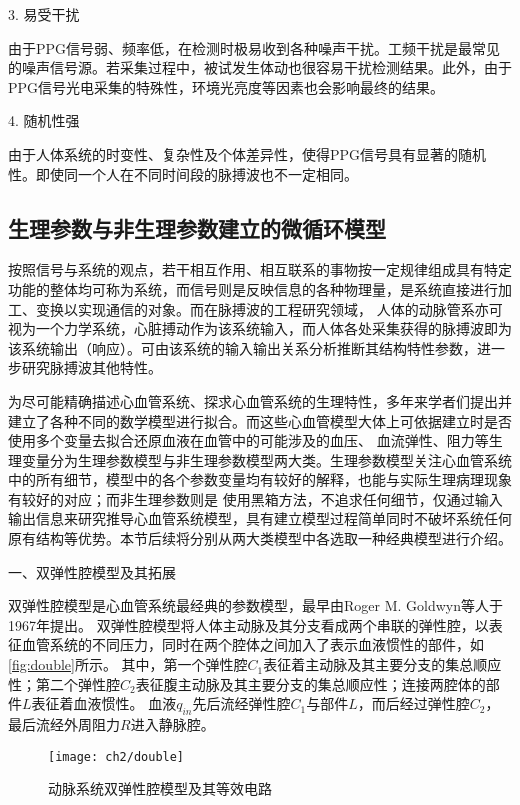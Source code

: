 3. 易受干扰

由于PPG信号弱、频率低，在检测时极易收到各种噪声干扰。工频干扰是最常见的噪声信号源。若采集过程中，被试发生体动也很容易干扰检测结果。此外，由于PPG信号光电采集的特殊性，环境光亮度等因素也会影响最终的结果。

4. 随机性强

由于人体系统的时变性、复杂性及个体差异性，使得PPG信号具有显著的随机性。即使同一个人在不同时间段的脉搏波也不一定相同。
\subsection{生理参数与非生理参数建立的微循环模型}
按照信号与系统的观点，若干相互作用、相互联系的事物按一定规律组成具有特定功能的整体均可称为系统，而信号则是反映信息的各种物理量，是系统直接进行加工、变换以实现通信的对象\cite{Alan2019}。而在脉搏波的工程研究领域，
人体的动脉管系亦可视为一个力学系统，心脏搏动作为该系统输入，而人体各处采集获得的脉搏波即为该系统输出（响应）。可由该系统的输入输出关系分析推断其结构特性参数，进一步研究脉搏波其他特性\cite{PPGYY}。

为尽可能精确描述心血管系统、探求心血管系统的生理特性，多年来学者们提出并建立了各种不同的数学模型进行拟合。而这些心血管模型大体上可依据建立时是否使用多个变量去拟合还原血液在血管中的可能涉及的血压、
血流弹性、阻力等生理变量分为生理参数模型与非生理参数模型两大类。生理参数模型关注心血管系统中的所有细节，模型中的各个参数变量均有较好的解释，也能与实际生理病理现象有较好的对应；而非生理参数则是
使用黑箱方法，不追求任何细节，仅通过输入输出信息来研究推导心血管系统模型，具有建立模型过程简单同时不破坏系统任何原有结构等优势。本节后续将分别从两大类模型中各选取一种经典模型进行介绍。

一、双弹性腔模型及其拓展

双弹性腔模型是心血管系统最经典的参数模型，最早由Roger M. Goldwyn等人\cite{Goldwyn1967}于1967年提出。
双弹性腔模型将人体主动脉及其分支看成两个串联的弹性腔，以表征血管系统的不同压力，同时在两个腔体之间加入了表示血液惯性的部件，如\autoref{fig:double}所示。
其中，第一个弹性腔$C_{1}$表征着主动脉及其主要分支的集总顺应性；第二个弹性腔$C_{2}$表征腹主动脉及其主要分支的集总顺应性；连接两腔体的部件$L$表征着血液惯性。
血液$q_{in}$先后流经弹性腔$C_{1}$与部件$L$，而后经过弹性腔$C_{2}$，最后流经外周阻力$R$进入静脉腔。
\begin{figure}[htbp]
    \centering
    \texttt{[image: ch2/double]}
    \caption{\label{fig:double}动脉系统双弹性腔模型及其等效电路}
\end{figure}

